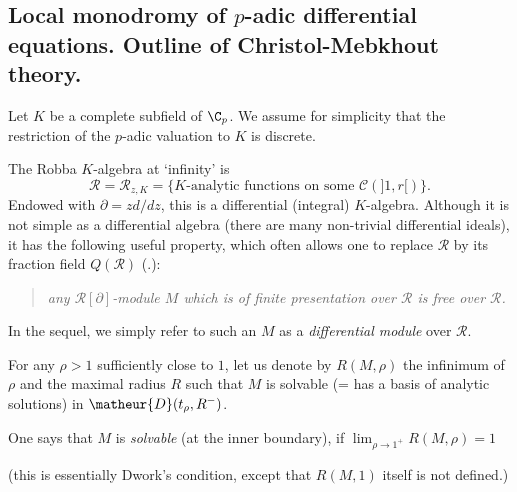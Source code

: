\subsection{Local monodromy of $p$-adic differential equations. Outline
 of Christol-Mebkhout theory.}\label{sub::3.2}

\begin{para}\label{para::3.2.1} Let $K$ be a complete subfield of
 $\C_p$. We assume for simplicity that the restriction of the $p$-adic 
valuation to $K$ is discrete. 

The Robba $K$-algebra at `infinity' is 
 \begin{equation*}
\mathcal{R}=\mathcal{R}_{z,K}= \{K\text{-analytic functions on some }
 \mathcal{C}(]1,r[)\}.
\end{equation*}
 Endowed with $\partial = zd/dz$, this is a differential (integral)
 $K$-algebra. Although it is not simple as a differential algebra (there
 are many non-trivial differential ideals), it has the following useful
 property, which often allows one to replace $\mathcal{R}$ by its
 fraction field $Q(\mathcal{R})$ (\cf \cite{andre:_repres_bessel}.): 

\begin{quote}
 {\it any $\mathcal{R}[\partial]$-module $M$ which is of finite
 presentation over $\mathcal{R}$ is free over $\mathcal{R}$.} 
\end{quote}
 In the sequel, we simply refer to such an $M$ as a
 {\it differential module} over $\mathcal{R}$.
\end{para}

\begin{para}\label{para::3.2.2} For any $\rho >1$ sufficiently close to $1$,
 let us denote by $R(M,\rho)$ the infinimum of $\rho$ and the maximal
 radius $R$ such that $M$ is solvable (= has a basis of analytic
 solutions) in $\matheur{D}(t_\rho, R^-)$.

 One says that  $M$ is  {\it solvable} (at the inner boundary), if  
 $\displaystyle\lim_{\rho \to 1^+}R(M,\rho) = 1$ 

 \noindent(this is essentially Dwork's condition, except that $R(M,1)$
 itself is not defined.)
\end{para}

